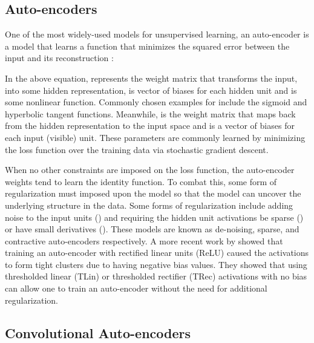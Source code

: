\documentclass{article} \usepackage{iclr2015,times}
\begin{document}
\subsection{Auto-encoders}

One of the most widely-used models for unsupervised learning, an auto-encoder is a model that learns a function that minimizes the squared error between the input  and its reconstruction :

In the above equation,  represents the weight matrix that transforms the input,  into some hidden representation,  is vector of biases for each hidden unit and  is some nonlinear function. Commonly chosen examples for  include the sigmoid and hyperbolic tangent functions. Meanwhile,  is the weight matrix that maps back from the hidden representation to the input space and  is a vector of biases for each input (visible) unit. These parameters are commonly learned by minimizing the loss function over the training data via stochastic gradient descent.

When no other constraints are imposed on the loss function, the auto-encoder weights tend to learn the identity function. To combat this, some form of regularization must imposed upon the model so that the model can uncover the underlying structure in the data. Some forms of regularization include adding noise to the input units (\citet{vincent2010stacked}) and requiring the hidden unit activations be sparse (\citet{coates2011analysis}) or have small derivatives (\citet{rifai2011contractive}). These models are known as de-noising, sparse, and contractive auto-encoders respectively. A more recent work by \citet{memisevic2014zero} showed that training an auto-encoder with rectified linear units (ReLU) caused the activations to form tight clusters due to having negative bias values. They showed that using thresholded linear (TLin) or thresholded rectifier (TRec) activations with no bias can allow one to train an auto-encoder without the need for additional regularization.

\subsection{Convolutional Auto-encoders}
\end{document}
